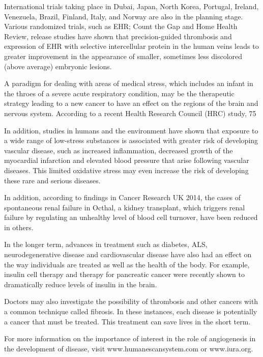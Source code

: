 \documentclass{article}
\begin{document}
International trials taking place in Dubai, Japan, North Korea, Portugal, Ireland, Venezuela, Brazil, Finland, Italy, and Norway are also in the planning stage. Various randomized trials, such as EHR; Count the Gap and Home Health Review, release studies have shown that precision-guided thrombosis and expression of EHR with selective intercellular protein in the human veins leads to greater improvement in the appearance of smaller, sometimes less discolored (above average) embryonic lesions.

A paradigm for dealing with areas of medical stress, which includes an infant in the throes of a severe acute respiratory condition, may be the therapeutic strategy leading to a new cancer to have an effect on the regions of the brain and nervous system. According to a recent Health Research Council (HRC) study, 75%

In addition, studies in humans and the environment have shown that exposure to a wide range of low-stress substances is associated with greater risk of developing vascular disease, such as increased inflammation, decreased growth of the myocardial infarction and elevated blood pressure that arise following vascular diseases. This limited oxidative stress may even increase the risk of developing these rare and serious diseases.

In addition, according to findings in Cancer Research UK 2014, the cases of spontaneous renal failure in Octhal, a kidney transplant, which triggers renal failure by regulating an unhealthy level of blood cell turnover, have been reduced in others.

In the longer term, advances in treatment such as diabetes, ALS, neurodegenerative disease and cardiovascular disease have also had an effect on the way individuals are treated as well as the health of the body. For example, insulin cell therapy and therapy for pancreatic cancer were recently shown to dramatically reduce levels of insulin in the brain.

Doctors may also investigate the possibility of thrombosis and other cancers with a common technique called fibrosis. In these instances, each disease is potentially a cancer that must be treated. This treatment can save lives in the short term.

For more information on the importance of interest in the role of angiogenesis in the development of disease, visit www.humanescansystem.com or www.iura.org.
\end{document}
